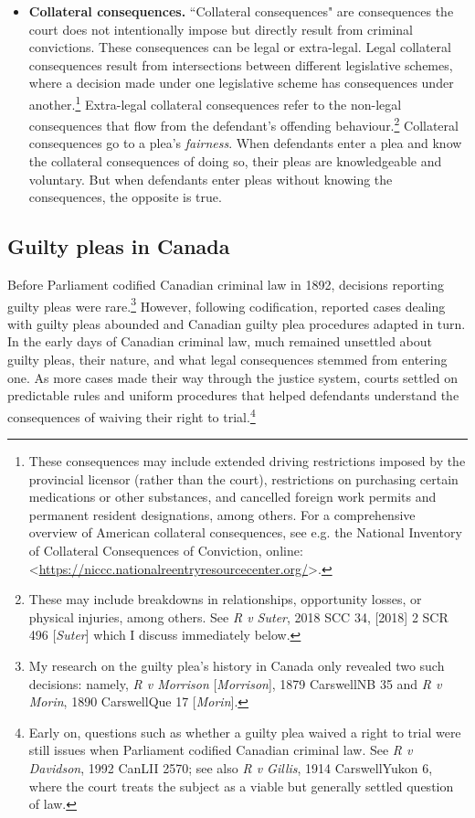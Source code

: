 \begin{itemize}
\item \textbf{Collateral consequences.} ``Collateral consequences" are consequences the court does not intentionally impose but directly result from criminal convictions. These consequences can be legal or extra-legal. Legal collateral consequences result from intersections between different legislative schemes, where a decision made under one legislative scheme has consequences under another.\footnote{These consequences may include extended driving restrictions imposed by the provincial licensor (rather than the court), restrictions on purchasing certain medications or other substances, and cancelled foreign work permits and permanent resident designations, among others. For a comprehensive overview of American collateral consequences, see e.g. the National Inventory of Collateral Consequences of Conviction, online: \textless \url{https://niccc.nationalreentryresourcecenter.org/}\textgreater.} Extra-legal collateral consequences refer to the non-legal consequences that flow from the defendant's offending behaviour.\footnote{These may include breakdowns in relationships, opportunity losses, or physical injuries, among others. See \textit{R v Suter}, 2018 SCC 34, [2018] 2 SCR 496 [\textit{Suter}] which I discuss immediately below.} Collateral consequences go to a plea's \textit{fairness}. When defendants enter a plea and know the collateral consequences of doing so, their pleas are knowledgeable and voluntary. But when defendants enter pleas without knowing the consequences, the opposite is true.
\end{itemize}

\subsection{Guilty pleas in Canada}

Before Parliament codified Canadian criminal law in 1892, decisions reporting guilty pleas were rare.\footnote{My research on the guilty plea's history in Canada only revealed two such decisions: namely, \textit{R v Morrison} [\textit{Morrison}], 1879 CarswellNB 35 and \textit{R v Morin}, 1890 CarswellQue 17 [\textit{Morin}].} However, following codification, reported cases dealing with guilty pleas abounded and Canadian guilty plea procedures adapted in turn. In the early days of Canadian criminal law, much remained unsettled about guilty pleas, their nature, and what legal consequences stemmed from entering one. As more cases made their way through the justice system, courts settled on predictable rules and uniform procedures that helped defendants understand the consequences of waiving their right to trial.\footnote{Early on, questions such as whether a guilty plea waived a right to trial were still issues when Parliament codified Canadian criminal law. See \textit{R v Davidson}, 1992 CanLII 2570; see also \textit{R v Gillis}, 1914 CarswellYukon 6, where the court treats the subject as a viable but generally settled question of law.}

